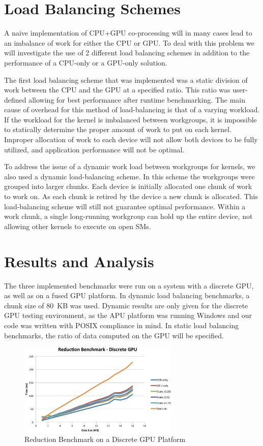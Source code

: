 \documentclass[journal]{IEEEtran}
\begin{document}
\section{Load Balancing Schemes}
A naive implementation of CPU+GPU co-processing will in many cases lead to an imbalance
of work for either the CPU or GPU.  To deal with this problem we will investigate the
use of 2 different load balancing schemes in addition to the performance of a CPU-only or
a GPU-only solution.

The first load balancing scheme that was implemented was a static division of work between
the CPU and the GPU at a specified ratio.  This ratio was user-defined allowing for best 
performance after runtime benchmarking.  The main cause of overhead for this method of
load-balancing is that of a varying workload.  If the workload for the kernel is imbalanced
between workgroups, it is impossible to statically determine the proper amount of work
to put on each kernel.  Improper allocation of work to each device will not allow both
devices to be fully utilized, and application performance will not be optimal.

To address the issue of a dynamic work load between workgroups for kernels, we also used
a dynamic load-balancing scheme.  In this scheme the workgroups were grouped into larger
chunks.  Each device is initially allocated one chunk of work to work on.  As each chunk
is retired by the device a new chunk is allocated.  This load-balancing scheme will still
not guarantee optimal performance.  Within a work chunk, a single long-running workgroup
can hold up the entire device, not allowing other kernels to execute on open SMs.

\section{Results and Analysis}
The three implemented benchmarks were run on a system with a discrete GPU, as well as
on a fused GPU platform.  In dynamic load balancing benchmarks, a chunk size of 80~KB
was used.  Dynamic results are only given for the discrete GPU testing environment,
as the APU platform was running Windows and our code was written with POSIX compliance
in mind.  In static load balancing benchmarks, the ratio of data computed on the GPU
will be specified.

\begin{figure}[t]
\centering
\includegraphics[width=3.0in]{reduce_discrete}
\caption{Reduction Benchmark on a Discrete GPU Platform}
\label{fig:reduce_discrete}
\end{figure}
\end{document}
